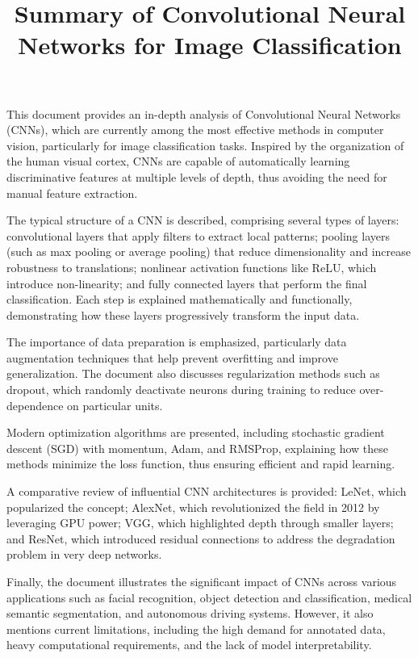 \documentclass[12pt]{article}
\title{Summary of Convolutional Neural Networks for Image Classification}
\author{}
\date{}
\begin{document}
\maketitle

This document provides an in-depth analysis of Convolutional Neural Networks (CNNs), which are currently among the most effective methods in computer vision, particularly for image classification tasks. Inspired by the organization of the human visual cortex, CNNs are capable of automatically learning discriminative features at multiple levels of depth, thus avoiding the need for manual feature extraction.

The typical structure of a CNN is described, comprising several types of layers: convolutional layers that apply filters to extract local patterns; pooling layers (such as max pooling or average pooling) that reduce dimensionality and increase robustness to translations; nonlinear activation functions like ReLU, which introduce non-linearity; and fully connected layers that perform the final classification. Each step is explained mathematically and functionally, demonstrating how these layers progressively transform the input data.

The importance of data preparation is emphasized, particularly data augmentation techniques that help prevent overfitting and improve generalization. The document also discusses regularization methods such as dropout, which randomly deactivate neurons during training to reduce over-dependence on particular units.

Modern optimization algorithms are presented, including stochastic gradient descent (SGD) with momentum, Adam, and RMSProp, explaining how these methods minimize the loss function, thus ensuring efficient and rapid learning.

A comparative review of influential CNN architectures is provided: LeNet, which popularized the concept; AlexNet, which revolutionized the field in 2012 by leveraging GPU power; VGG, which highlighted depth through smaller layers; and ResNet, which introduced residual connections to address the degradation problem in very deep networks.

Finally, the document illustrates the significant impact of CNNs across various applications such as facial recognition, object detection and classification, medical semantic segmentation, and autonomous driving systems. However, it also mentions current limitations, including the high demand for annotated data, heavy computational requirements, and the lack of model interpretability.
\end{document}
